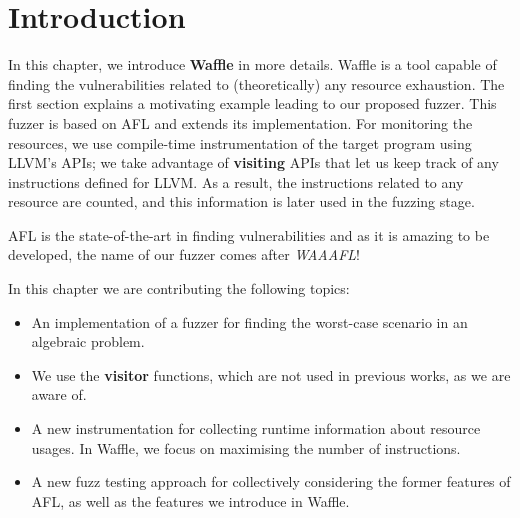 \section{Introduction}
In this chapter, we introduce \textbf{Waffle} in more details. Waffle is a tool capable of finding the vulnerabilities related to (theoretically) any resource exhaustion. The first section explains a motivating example leading to our proposed fuzzer. This fuzzer is based on AFL and extends its implementation. For monitoring the resources, we use compile-time instrumentation of the target program using LLVM's APIs; we take advantage of \textbf{visiting} APIs that let us keep track of any instructions defined for LLVM. As a result, the instructions related to any resource are counted, and this information is later used in the fuzzing stage.

AFL is the state-of-the-art in finding vulnerabilities and as it is amazing to be developed, the name of our fuzzer comes after \textit{WAAAFL}!

\vspace{\baselineskip}

In this chapter we are contributing the following topics:

\begin{itemize}
    \item An implementation of a fuzzer for finding the worst-case scenario in an algebraic problem.
    \item We use the \textbf{visitor} functions, which are not used in previous works, as we are aware of.
    \item A new instrumentation for collecting runtime information about resource usages. In Waffle, we focus on maximising the number of instructions.
    \item A new fuzz testing approach for collectively considering the former features of AFL, as well as the features we introduce in Waffle.
\end{itemize}
